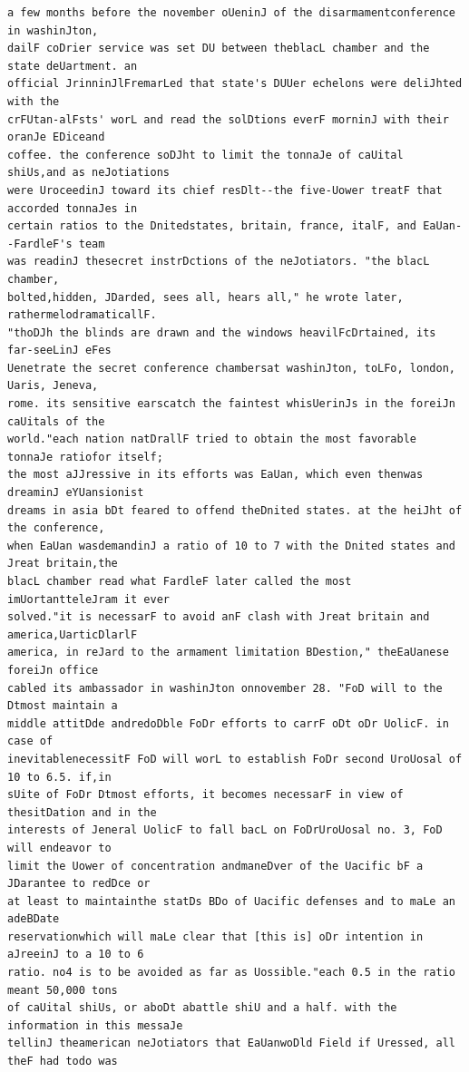 \documentclass[11pt,a4paper]{article}
\begin{document}
\begin{lstlisting}[style=ciphertext,caption={Complete text after iteration 9}]
a few months before the november oUeninJ of the disarmamentconference in washinJton,
dailF coDrier service was set DU between theblacL chamber and the state deUartment. an
official JrinninJlFremarLed that state's DUUer echelons were deliJhted with the
crFUtan-alFsts' worL and read the solDtions everF morninJ with their oranJe EDiceand
coffee. the conference soDJht to limit the tonnaJe of caUital shiUs,and as neJotiations
were UroceedinJ toward its chief resDlt--the five-Uower treatF that accorded tonnaJes in
certain ratios to the Dnitedstates, britain, france, italF, and EaUan--FardleF's team
was readinJ thesecret instrDctions of the neJotiators. "the blacL chamber,
bolted,hidden, JDarded, sees all, hears all," he wrote later, rathermelodramaticallF.
"thoDJh the blinds are drawn and the windows heavilFcDrtained, its far-seeLinJ eFes
Uenetrate the secret conference chambersat washinJton, toLFo, london, Uaris, Jeneva,
rome. its sensitive earscatch the faintest whisUerinJs in the foreiJn caUitals of the
world."each nation natDrallF tried to obtain the most favorable tonnaJe ratiofor itself;
the most aJJressive in its efforts was EaUan, which even thenwas dreaminJ eYUansionist
dreams in asia bDt feared to offend theDnited states. at the heiJht of the conference,
when EaUan wasdemandinJ a ratio of 10 to 7 with the Dnited states and Jreat britain,the
blacL chamber read what FardleF later called the most imUortantteleJram it ever
solved."it is necessarF to avoid anF clash with Jreat britain and america,UarticDlarlF
america, in reJard to the armament limitation BDestion," theEaUanese foreiJn office
cabled its ambassador in washinJton onnovember 28. "FoD will to the Dtmost maintain a
middle attitDde andredoDble FoDr efforts to carrF oDt oDr UolicF. in case of
inevitablenecessitF FoD will worL to establish FoDr second UroUosal of 10 to 6.5. if,in
sUite of FoDr Dtmost efforts, it becomes necessarF in view of thesitDation and in the
interests of Jeneral UolicF to fall bacL on FoDrUroUosal no. 3, FoD will endeavor to
limit the Uower of concentration andmaneDver of the Uacific bF a JDarantee to redDce or
at least to maintainthe statDs BDo of Uacific defenses and to maLe an adeBDate
reservationwhich will maLe clear that [this is] oDr intention in aJreeinJ to a 10 to 6
ratio. no4 is to be avoided as far as Uossible."each 0.5 in the ratio meant 50,000 tons
of caUital shiUs, or aboDt abattle shiU and a half. with the information in this messaJe
tellinJ theamerican neJotiators that EaUanwoDld Field if Uressed, all theF had todo was

\end{lstlisting}
\end{document}
